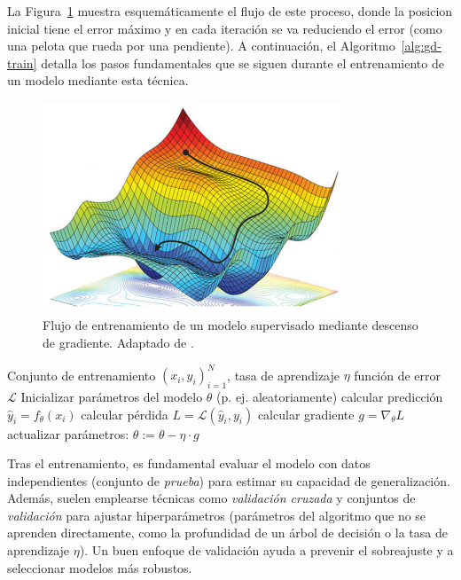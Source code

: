 \documentclass[11pt,spanish,listoffigures,listoftables]{tfgetsinf}
\begin{document}
La Figura~\ref{fig:gd_flow} muestra esquemáticamente el flujo de este proceso, donde la posicion inicial tiene el error máximo y en cada
iteración se va reduciendo el error (como una pelota que rueda por una pendiente). A continuación, el Algoritmo~\ref{alg:gd-train} detalla 
los pasos fundamentales que se siguen durante el entrenamiento de un modelo mediante esta técnica.

\begin{figure}[ht]
    \centering
    \includegraphics[width=0.8\textwidth]{descenso_gradiente.png}
    \caption{Flujo de entrenamiento de un modelo supervisado mediante descenso de gradiente. Adaptado de \cite{logongasBackprop}.}
    \label{fig:gd_flow}
\end{figure}

\begin{algorithmic}
    \label{alg:gd-train}
    \REQUIRE Conjunto de entrenamiento ${(x_i, y_i)}_{i=1}^N$, tasa de aprendizaje $\eta$ función de error $\mathcal{L}$
    \STATE Inicializar parámetros del modelo $\theta$ (p. ej. aleatoriamente)
            \STATE calcular predicción $\hat{y}_i = f_\theta(x_i)$
            \STATE calcular pérdida $L = \mathcal{L}(\hat{y}_i, y_i)$ 
            \STATE calcular gradiente $g = \nabla_{\theta} L$
            \STATE actualizar parámetros: $\theta := \theta - \eta \cdot g$
        \ENDFOR
    \ENDFOR
\end{algorithmic}

Tras el entrenamiento, es fundamental evaluar el modelo con datos independientes (conjunto de \textit{prueba}) para estimar su capacidad de generalización. 
Además, suelen emplearse técnicas como \textit{validación cruzada} y conjuntos de \textit{validación} para ajustar hiperparámetros (parámetros del algoritmo 
que no se aprenden directamente, como la profundidad de un árbol de decisión o la tasa de aprendizaje $\eta$). Un buen enfoque de validación ayuda a prevenir 
el sobreajuste y a seleccionar modelos más robustos.
\end{document}
